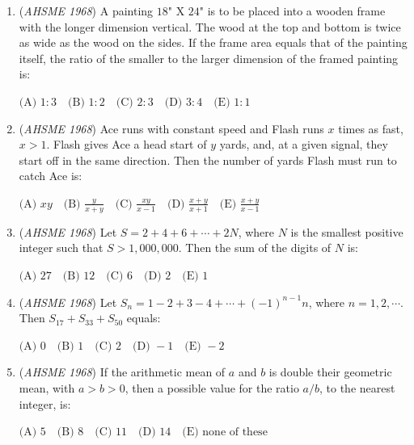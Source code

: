 \begin{enumerate}
 $\text{(A) all real values of }x \quad\\ \text{(B) no real values of } x\quad\\ \text{(C) all real values of } x \text{ except } x=0\quad\\ \text{(D) no real values of } x \text{ except } x=0\quad\\ \text{(E) all real values of } x \text{ except } x=1$


	\item (\textit{AHSME 1968}) A painting $18$" X $24$" is to be placed into a wooden frame with the longer dimension vertical. The wood at the top and bottom is twice as wide as the wood on the sides. If the frame area equals that of the painting itself, the ratio of the smaller to the larger dimension of the framed painting is:


 $\text{(A) } 1:3\quad \text{(B) } 1:2\quad \text{(C) } 2:3\quad \text{(D) } 3:4\quad \text{(E) } 1:1$


	\item (\textit{AHSME 1968}) Ace runs with constant speed and Flash runs $x$ times as fast, $x>1$. Flash gives Ace a head start of $y$ yards, and, at a given signal, they start off in the same direction. Then the number of yards Flash must run to catch Ace is:


 $\text{(A) } xy\quad \text{(B) } \frac{y}{x+y}\quad \text{(C) } \frac{xy}{x-1}\quad \text{(D) } \frac{x+y}{x+1}\quad \text{(E) } \frac{x+y}{x-1}$


	\item (\textit{AHSME 1968}) Let $S=2+4+6+\cdots +2N$, where $N$ is the smallest positive integer such that $S>1,000,000$. Then the sum of the digits of $N$ is:


 $\text{(A) } 27\quad \text{(B) } 12\quad \text{(C) } 6\quad \text{(D) } 2\quad \text{(E) } 1$


	\item (\textit{AHSME 1968}) Let $S_n=1-2+3-4+\cdots +(-1)^{n-1}n$, where $n=1,2,\cdots$. Then $S_{17}+S_{33}+S_{50}$ equals:


 $\text{(A) } 0\quad \text{(B) } 1\quad \text{(C) } 2\quad \text{(D) } -1\quad \text{(E) } -2$


	\item (\textit{AHSME 1968}) If the arithmetic mean of $a$ and $b$ is double their geometric mean, with $a>b>0$, then a possible value for the ratio $a/b$, to the nearest integer, is:


 $\text{(A) } 5\quad \text{(B) } 8\quad \text{(C) } 11\quad \text{(D) } 14\quad \text{(E) none of these}$



\end{enumerate}
